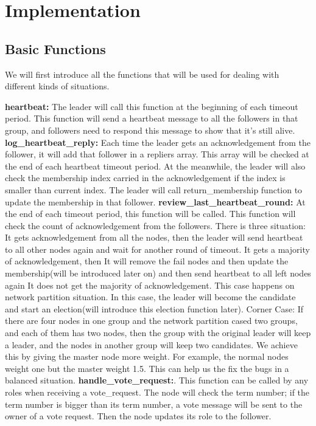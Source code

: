 \documentclass[a4paper,11pt]{article}
\begin{document}
\section{Implementation}
\subsection{Basic Functions}
We will first introduce all the functions that will be used for dealing with different kinds of situations.
\begin{outline}
\1 \textbf{heartbeat:} The leader will call this function at the beginning of each timeout period. This function will send a heartbeat message to all the followers in that group, and followers need to respond this message to show that it's still alive.
\1 \textbf{log\_heartbeat\_reply:} Each time the leader gets an acknowledgement from the follower, it will add that follower in a repliers array. This array will be checked at the end of each heartbeat timeout period. At the meanwhile, the leader will also check the membership index carried in the acknowledgement if the index is smaller than current index. The leader will call return\_membership function to update the membership in that follower.
\1 \textbf{review\_last\_heartbeat\_round:} At the end of each timeout period, this function will be called. This function will check the count of acknowledgement from the followers. There is three situation:
  \2 It gets acknowledgement from all the nodes, then the leader will send heartbeat to all other nodes again and wait for another round of timeout.
  \2 It gets a majority of acknowledgement, then It will remove the fail nodes and then update the membership(will be introduced later on) and then send heartbeat to all left nodes again
  \2 It does not get the majority of acknowledgement. This case happens on network partition situation. In this case, the leader will become the candidate and start an election(will introduce this election function later).
  \2 Corner Case: If there are four nodes in one group and the network partition cased two groups, and each of them has two nodes, then the group with the original leader will keep a leader, and the nodes in another group will keep two candidates. We achieve this by giving the master node more weight. For example, the normal nodes weight one but the master weight 1.5. This can help us the fix the bugs in a balanced situation.
\1 \textbf{handle\_vote\_request:}. This function can be called by any roles when receiving a vote\_request. The node will check the term number; if the term number is bigger than its term number, a vote message will be sent to the owner of a vote request. Then the node updates its role to the follower.

\end{outline}
\end{document}
